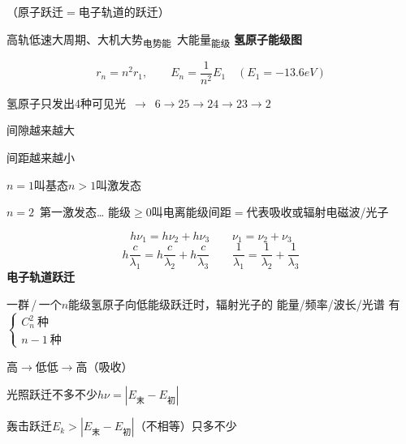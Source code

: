 （原子跃迁$=$电子轨道的跃迁） %

高轨低速大周期、大机大势\textsubscript{电势能}\ 大能量\textsubscript{能级}
\textbf{氢原子能级图}

\[
r_n=n^2r_1,\qquad E_n=\frac{1}{n^2}E_1\quad(E_1=-13.6\unit{eV})
\]


氢原子只发出4种可见光\ $\to$\ $6\to2$\quad $5\to2$\quad $4\to2$\quad $3\to2$ %


间隙越来越大 %


间距越来越小 %

$n=1$叫基态\quad $n>1$叫激发态

$n=2$\ 第一激发态…
能级$\ge0$叫电离\qquad 能级间距$=$代表吸收或辐射电磁波/光子

\[
h\nu_1=h\nu_2+h\nu_3\qquad \nu_1=\nu_2+\nu_3 %
\]
\[
h\frac{c}{\lambda_1}=h\frac{c}{\lambda_2}+h\frac{c}{\lambda_3}\qquad \frac{1}{\lambda_1}=\frac{1}{\lambda_2}+\frac{1}{\lambda_3}
\]
\textbf{电子轨道跃迁}

一群\,/\,一个\quad $n$能级氢原子向低能级跃迁时，辐射光子的 能量/频率/波长/光谱 有\quad $\left\{\begin{array}{l}C_n^2\ \text{种}\\ n-1\ \text{种}\end{array}\right.$ %

高$\to$低\qquad 低$\to$高（吸收） %

光照跃迁\quad 不多不少\quad $h\nu=|E_{\text{末}}-E_{\text{初}}|$

轰击跃迁\quad $E_k>|E_{\text{末}}-E_{\text{初}}|$（不相等）\quad 只多不少

